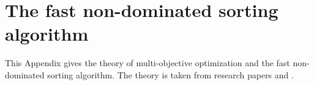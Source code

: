 \chapter{The fast non-dominated sorting algorithm}
\normalsize
\label{The fast non-dominated sorting procedure}
This Appendix gives the theory of multi-objective optimization and the fast non-dominated sorting algorithm. The theory is taken from research papers \cite{ortega2017non} and \cite{miettinen2012nonlinear}.

